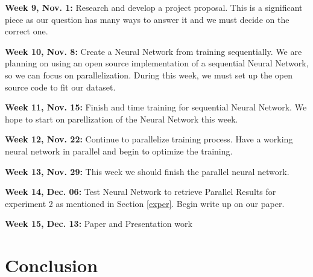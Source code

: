 \documentclass[11pt]{article}
\newenvironment{my_enumerate}{
  \begin{enumerate}
    \setlength{\itemsep}{1pt}
      \setlength{\parskip}{0pt}
\setlength{\parsep}{0pt}}{\end{enumerate}
}
\begin{document}
\begin{my_enumerate}
  \item \textbf{Week 9, Nov. 1:} Research and develop a project proposal. This is a significant piece as our question has many ways to answer it and we must decide on the correct one.
  \item \textbf{Week 10, Nov. 8:} Create a Neural Network from training sequentially. We are planning on using an open source implementation of a sequential Neural Network, so we can focus on parallelization. During this week, we must set up the open source code to fit our dataset.
  \item \textbf{Week 11, Nov. 15:} Finish and time training for sequential Neural Network. We hope to start on parellization of the Neural Network this week.
  \item \textbf{Week 12, Nov. 22:} Continue to parallelize training process. Have a working neural network in parallel and begin to optimize the training.
  \item \textbf{Week 13, Nov. 29:}  This week we should finish the parallel neural network.
  \item \textbf{Week 14, Dec. 06:} Test Neural Network to retrieve Parallel Results for experiment 2 as mentioned in Section \ref{exper}. Begin write up on our paper.
  \item \textbf{Week 15, Dec. 13:} Paper and Presentation work
\end{my_enumerate} 


\section {Conclusion}\label{conc} 
\end{document}
